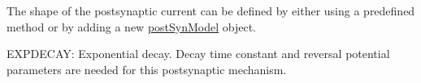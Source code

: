 The shape of the postsynaptic current can be defined by either using a predefined method or by adding a new \hyperlink{structpostSynModel}{post\+Syn\+Model} object.


\begin{DoxyItemize}
\item E\+X\+P\+D\+E\+C\+A\+Y\+: Exponential decay. Decay time constant and reversal potential parameters are needed for this postsynaptic mechanism. 
\end{DoxyItemize}